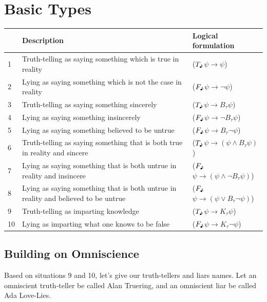 \documentclass[12pt, titlepage, twoside]{report}
\newcommand{\true}{$T_\text{\textmusicalnote}$}
\newcommand{\false}{$F_\text{\textmusicalnote}$}
\begin{document}
\chapter{Basic Types}
\begin{table}[h]
\begin{tabular}{lp{9cm}l}
\hline
   & Description                                                                        & Logical formulation                                            \\ \hline
1  & Truth-telling as saying something which is true in reality                         & (\true$\psi \to \psi$)                            \\
2  & Lying as saying something which is not the case in reality                         & (\false$\psi \to \neg \psi$)                      \\
3  & Truth-telling as saying something sincerely                                        & (\true$\psi \to B_\tau \psi$)                     \\
4  & Lying as saying something insincerely                                              & (\false$\psi \to \neg B_\tau \psi$)               \\
5  & Lying as saying something believed to be untrue                                    & (\false$\psi \to  B_\tau \neg \psi$)              \\
6  & Truth-telling as saying something that is both true in reality and sincere         & (\true$\psi \to (\psi \wedge B_\tau \psi)$)       \\
7  & Lying as saying something that is both untrue in reality and insincere             & (\false$\psi \to (\psi \wedge \neg B_\tau \psi)$) \\
8  & Lying as saying something that is both untrue in reality and believed to be untrue & (\false$\psi \to (\psi \vee B_\tau \neg \psi)$)   \\
9  & Truth-telling as imparting knowledge                                               & (\true$\psi \to K_\tau \psi$)                     \\
10 & Lying as imparting what one knows to be false                                      & (\false$\psi \to K_\tau \neg \psi$)               \\ \hline
\end{tabular}
\end{table}

\section{Building on Omniscience}
Based on situations 9 and 10, let's give our truth-tellers and liars names. Let an omniscient truth-teller be called Alan Truering, and an omniscient liar be called Ada Love-Lies.\\
\end{document}

